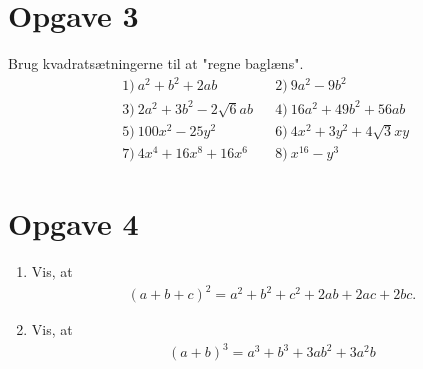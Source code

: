 \section*{Opgave 3}
Brug kvadratsætningerne til at "regne baglæns".
\begin{align*}
&1) \  a^2+b^2+2ab  &&2) \  9a^2-9b^2   \\
&3) \  2a^2+3b^2-2\sqrt{6}ab  &&4) \  16a^2+49b^2+56ab   \\
&5) \   100x^2 - 25y^2  &&6) \   4x^2+3y^2+4\sqrt{3}xy   \\
&7) \  4x^4+16x^8+16x^6  &&8) \ x^{16}-y^{3}     
\end{align*}
\section*{Opgave 4}
\begin{enumerate}[label=\roman*)]
	\item Vis, at 
	\begin{align*}
		(a+b+c)^2 = a^2+b^2+c^2+2ab+2ac+2bc.
	\end{align*}
	\item Vis, at 
	\begin{align*}
		(a+b)^3 = a^3+b^3+3ab^2+3a^2b
	\end{align*}
\end{enumerate}
